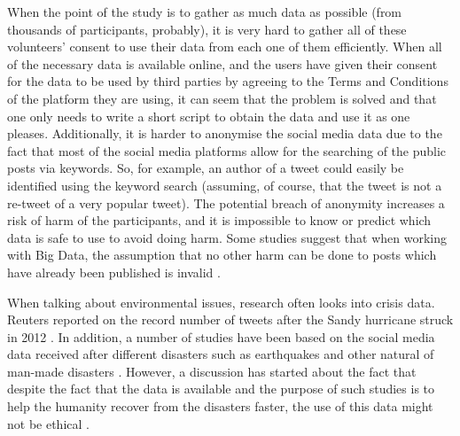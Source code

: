 When the point of the study is to gather as much data as possible (from thousands of participants, probably), it is very hard to gather all of these volunteers' consent to use their data from each one of them efficiently. When all of the necessary data is available online, and the users have given their consent for the data to be used by third parties by agreeing to the Terms and Conditions of the platform they are using, it can seem that the problem is solved and that one only needs to write a short script to obtain the data and use it as one pleases. 
Additionally, it is harder to anonymise the social media data due to the fact that most of the social media platforms allow for the searching of the public posts via keywords. So, for example, an author of a tweet could easily be identified using the keyword search (assuming, of course, that the tweet is not a re-tweet of a very popular tweet). The potential breach of anonymity increases a risk of harm of the participants, and it is impossible to know or predict which data is safe to use to avoid doing harm. Some studies suggest that when working with Big Data, the assumption that no other harm can be done to posts which have already been published is invalid \cite{humansubjectsbigdata}. 

When talking about environmental issues, research often looks into crisis data. Reuters reported on the record number of tweets after the Sandy hurricane struck in 2012 \cite{reuterssandy}. In addition, a number of studies have been based on the social media data received after different disasters such as earthquakes \cite{earthquakes} and other natural of man-made disasters \cite{haiti}.
However, a discussion has started about the fact that despite the fact that the data is available and the purpose of such studies is to help the humanity recover from the disasters faster, the use of this data might not be ethical \cite{crisisdata}. 

